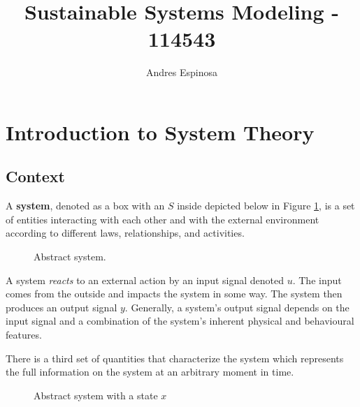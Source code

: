 \documentclass[11pt]{article}
\title{Sustainable Systems Modeling - 114543}
\author{Andres Espinosa}
\begin{document}
\pgfplotsset{compat=1.18}
\maketitle

\tableofcontents

\section{Introduction to System Theory}
\subsection{Context}
A \textbf{system}, denoted as a box with an $S$ inside depicted below in Figure \ref{figure:system}, is a set of entities interacting with each other and with the external environment according to different laws, relationships, and activities.

\begin{figure}[h]
  \centering
  \caption{Abstract system.}
  \label{figure:system}
\end{figure}

A system \textit{reacts} to an external action by an input signal denoted $u$.
The input comes from the outside and impacts the system in some way.
The system then produces an output signal $y$.
Generally, a system's output signal depends on the input signal and a combination of the system's inherent physical and behavioural features.

There is a third set of quantities that characterize the system which represents the full information on the system at an arbitrary moment in time.

\begin{figure}[h]
  \centering
  \caption{Abstract system with a state $x$}
  \label{figure:system_w_state}
\end{figure}
\end{document}
